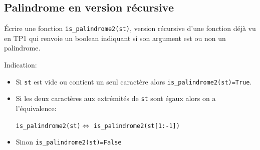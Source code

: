 \documentclass[a4paper]{article}
\begin{document}
\subsection{Palindrome en version récursive}
Écrire une fonction {\tt is\_palindrome2(st)},  version récursive d'une fonction déjà vu en TP1 qui renvoie un boolean indiquant  si son argument est ou non un palindrome.

Indication: 
\begin{itemize}
\item Si {\tt st} est vide ou contient un seul caractère alors  {\tt is\_palindrome2(st)=True}.
\item Si les deux caractères aux  extrémités de {\tt st}  sont égaux  alors on a l'équivalence:

                      {\tt is\_palindrome2(st)}$\Longleftrightarrow$ {\tt is\_palindrome2(st[1:-1])}
\item Sinon {\tt is\_palindrome2(st)=False}
\end{itemize}
\end{document}
